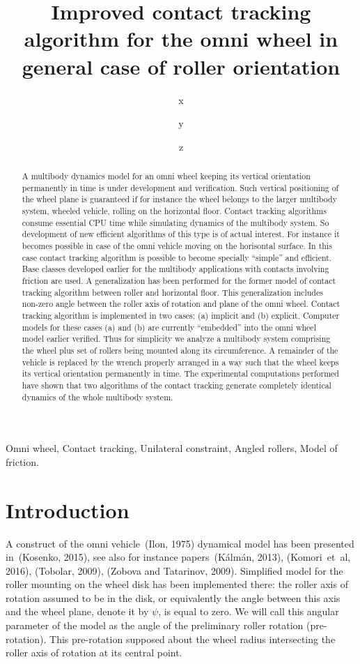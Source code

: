 \documentclass{jsme-tj}
\title{Improved contact tracking algorithm for the omni wheel in general case 
of roller orientation}
\author{x}{Ivan KOSENKO}
\author{y}{Sergey STEPANOV}
\author{z}{Kirill GERASIMOV}
\begin{document}
\maketitle

\begin{abstract}
A multibody dynamics model for an omni wheel keeping its vertical orientation 
permanently in time is under development and verification. Such vertical 
positioning of the wheel plane is guaranteed if for instance the wheel belongs
to the larger multibody system, wheeled vehicle, rolling on the horizontal
floor. Contact tracking algorithms consume essential CPU time while simulating
dynamics of the multibody system. So development of new efficient algorithms of
this type is of actual interest. For instance it becomes possible in case of 
the omni vehicle moving on the horisontal surface. In this case contact 
tracking algorithm is possible to become specially ``simple'' and efficient. 
Base classes developed earlier for the multibody applications with contacts 
involving friction are used. A generalization has been performed for the former 
model of contact tracking algorithm between roller and horizontal floor. This 
generalization includes non-zero angle between the roller axis of rotation and 
plane of the omni wheel. Contact tracking algorithm is implemented in two 
cases: (a) implicit and (b) explicit. Computer models for these cases (a) and 
(b) are currently ``embedded'' into the omni wheel model earlier verified. Thus 
for simplicity we analyze a multibody system comprising the wheel plus set of 
rollers being mounted along its circumference. A remainder of the vehicle is 
replaced by the wrench properly arranged in a way such that the wheel keeps its 
vertical orientation permanently in time. The experimental computations 
performed have shown that two algorithms of the contact tracking generate 
completely identical dynamics of the whole multibody system.
\end{abstract}

\begin{keywords}
Omni wheel, Contact tracking, Unilateral constraint, Angled rollers, Model of 
friction.
\end{keywords}

\section{Introduction}

A construct of the omni vehicle~(Ilon, 1975) dynamical model has been presented 
in~(Kosenko, 2015), see also for instance papers~(K\'alm\'an, 2013), 
(Komori~et~al, 2016), (Tobolar, 2009), (Zobova and Tatarinov, 2009). Simplified 
model for the roller mounting on the wheel disk has been implemented there: the 
roller axis of rotation assumed to be in the disk, or equivalently the angle 
between this axis and the wheel plane, denote it by $\psi $, is equal to zero. 
We will call this angular parameter of the model as the angle of the 
preliminary roller rotation (pre-rotation). This pre-rotation supposed about 
the wheel radius intersecting the roller axis of rotation at its central point.
\end{document}
